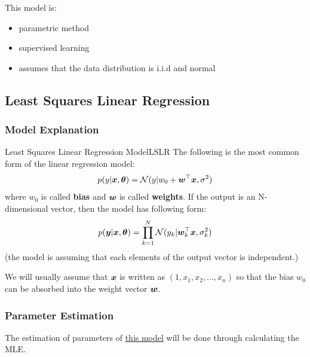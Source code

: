 \documentclass{article}
\begin{document}
    This model is:
    \begin{itemize}
        \item parametric method
        \item supervised learning
        \item assumes that the data distribution is i.i.d and normal
    \end{itemize}

    \subsection{Least Squares Linear Regression}
        \subsubsection{Model Explanation}
            \begin{defn}{Least Squares Linear Regression Model}{LSLR}
                The following is the most common form of the linear regression model:
                \[
                p(y|\boldsymbol{x}, \boldsymbol{\theta}) = \mathcal{N}(y|w_0+\boldsymbol{w}^\top \boldsymbol{x}, \sigma^2)
                \]
                where $w_0$ is called \textbf{bias} and $\boldsymbol{w}$ is called \textbf{weights}. If the output is an N-dimensional vector, then the model has following form:
                \[ 
                p(\boldsymbol{y}|\boldsymbol{x}, \boldsymbol{\theta}) = \prod_{k=1}^{N}\mathcal{N}(y_k|\boldsymbol{w}_k^\top\boldsymbol{x}, \sigma_{k}^{2})
                \]
                (the model is assuming that each elements of the output vector is independent.)
            \end{defn}

            We will usually assume that $\boldsymbol{x}$ is written as $(1, x_1, x_2, \ldots, x_n)$ so that the bias $w_0$ can be absorbed into the weight vector $\boldsymbol{w}$.

        \subsubsection{Parameter Estimation}
            The estimation of parameters of \hyperref[defn:LSLR]{this model} will be done through calculating the MLE.
\end{document}
